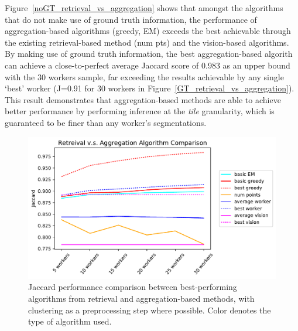 Figure~\ref{noGT_retrieval_vs_aggregation} shows that amongst the algorithms that do not make use of ground truth information, the performance of aggregation-based algorithms (greedy, EM) exceeds the best achievable through the existing retrieval-based method (num pts) and the vision-based algorithms. 
By making use of ground truth information, the best aggregation-based algorith can achieve a close-to-perfect average Jaccard score of 0.983 as an upper bound with the 30 workers sample, far exceeding the results achievable by any single `best' worker (J=0.91 for 30 workers in Figure~\ref{GT_retrieval_vs_aggregation}). This result demonstrates that aggregation-based methods are able to achieve better performance by performing inference at the \textit{tile} granularity, which is guaranteed to be finer than any worker's segmentations. 
 \begin{figure}[h!]
   \centering
   \includegraphics[width=\textwidth]{plots/Retreival_vs_Aggregation.pdf}
   \caption{Jaccard performance comparison between best-performing algorithms from retrieval and aggregation-based methods, with clustering as a preprocessing step where possible. Color denotes the type of algorithm used.}
   \label{retreival_vs_aggregation}
 \end{figure}


